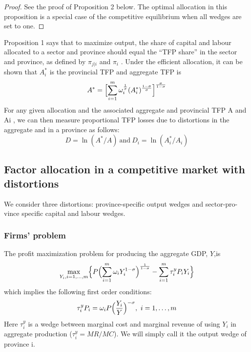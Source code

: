 \documentclass{article}
\begin{document}
    \begin{proof}
        See the proof of Proposition 2 below. The optimal allocation in this proposition is a special case of the competitive equilibrium when all wedges are set to one.
    \end{proof}

    Proposition 1 says that to maximize output, the share of capital and labour allocated to a sector and province should equal the “TFP share” in the sector and province, as defined by $\pi_{j|i}$ and $\pi_i$ . Under the efficient allocation, it can be shown that $A_i^*$ is the provincial TFP and aggregate TFP is
    \begin{equation*}
        A^*=\Bigl[ \sum_{i=1}^m \omega_i^{\frac{1}{\sigma}} (A_i^*)^{\frac{1-\sigma}{\sigma}} \Bigr]^{\frac{\sigma}{1-\sigma}}
    \end{equation*}
    For any given allocation and the associated aggregate and provincial TFP A and Ai , we can then measure proportional TFP losses due to distortions in the aggregate and in a province as follows:
    \begin{equation*}
        D=\ln(A^*/A)\ \text{and}\ D_i=\ln(A_i^*/A_i)
    \end{equation*}

    \subsection*{Factor allocation in a competitive market with distortions}
    
    We consider three distortions: province-specific output wedges and sector-pro-vince specific capital and labour wedges.

    \subsubsection*{Firms’ problem}
    The profit maximization problem for producing the aggregate GDP, $Y$,is
    \begin{equation*}
        \max_{Y_i, i=1,\dots,m} \Bigl\{ P \Bigl( \sum_{i=1}^m \omega_i Y_i^{1-\sigma} \Bigr)^{\frac{1}{1-\sigma}} -\sum_{i=1}^m \tau_i^y P_i Y_i \Bigr\}
    \end{equation*}
    which implies the following first order conditions:
    \begin{equation}
        \tau_i^y P_i=\omega_i P \Bigl( \frac{Y_i}{Y} \Bigr)^{-\sigma},\ i=1,\dots,m
    \end{equation}
    Here $\tau_i^y$ is a wedge between marginal cost and marginal revenue of using $Y_i$ in aggregate production ($\tau_i^y=MR/MC$). We will simply call it the output wedge of province i.
\end{document}
